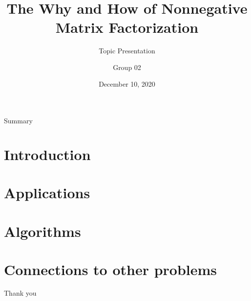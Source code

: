 \documentclass[aspectratio=43]{beamer}
\title[Nonnegative Matrix Factorization]{The Why and How of Nonnegative Matrix Factorization} %
\subtitle{Topic Presentation}
\author[Group 02]{Group 02}
\institute[LINMA2380]{
    LINMA2380 --- Matrix computations
} %
\date{December 10, 2020}
\begin{document}
    
    \frame{\titlepage}
        
    \begin{frame}{Summary}
        \tableofcontents
    \end{frame}
    \section{Introduction}
    
	\section{Applications}
    
    \section{Algorithms}
    
	\section{Connections to other problems}
	
  	\begin{frame}
  	\centering
  	Thank you
  	\end{frame}
\end{document}
